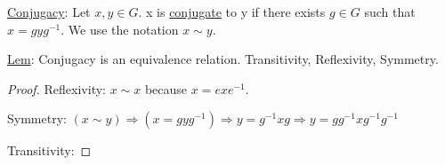 \documentclass[11pt]{scrartcl}
\begin{document}
\begin{definition}
  \ul{Conjugacy}: Let $x, y \in G$. x is \ul{conjugate} to y if there exists $g \in G$ such that $x = gyg^{-1}$. We use the notation $x \sim y$.

  \ul{Lem}: Conjugacy is an equivalence relation. Transitivity, Reflexivity, Symmetry.
  \begin{proof}
    Reflexivity: $x \sim x$ because $x = exe^{-1}$.

    Symmetry: $(x \sim y) \Rightarrow (x = gyg^{-1}) \Rightarrow y = g^{-1}xg \Rightarrow y = gg^{-1}xg^{-1}g^{-1}$

    Transitivity: 
  \end{proof}
\end{definition}
\end{document}
